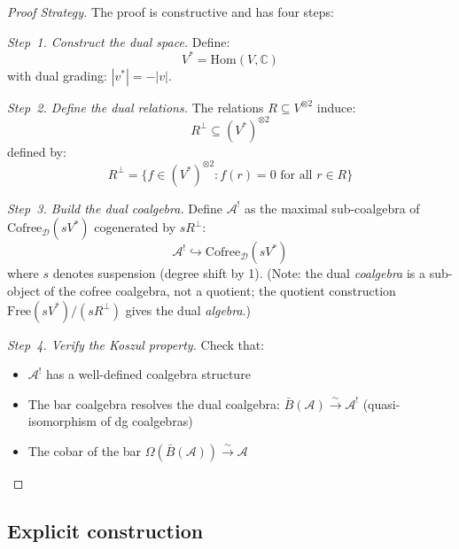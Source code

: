 \begin{proof}[Proof Strategy]
The proof is constructive and has four steps:

\emph{Step~1. Construct the dual space.}
Define:
\[V^* = \text{Hom}(V, \mathbb{C})\]
with dual grading: $|v^*| = -|v|$.

\emph{Step~2. Define the dual relations.}
The relations $R \subseteq V^{\otimes 2}$ induce:
\[R^\perp \subseteq (V^*)^{\otimes 2}\]
defined by:
\[R^\perp = \{f \in (V^*)^{\otimes 2} : f(r) = 0 \text{ for all } r \in R\}\]

\emph{Step~3. Build the dual coalgebra.}
Define $\mathcal{A}^!$ as the maximal sub-coalgebra of $\text{Cofree}_{\mathcal{D}}(sV^*)$ cogenerated by $sR^\perp$:
\[\mathcal{A}^! \hookrightarrow \text{Cofree}_{\mathcal{D}}(sV^*)\]
where $s$ denotes suspension (degree shift by 1).  (Note: the dual \emph{coalgebra} is a sub-object of the cofree coalgebra, not a quotient; the quotient construction $\text{Free}(sV^*)/(sR^\perp)$ gives the dual \emph{algebra}.)

\emph{Step~4. Verify the Koszul property.}
Check that:
\begin{itemize}
\item $\mathcal{A}^!$ has a well-defined coalgebra structure
\item The bar coalgebra resolves the dual coalgebra: $\bar{B}(\mathcal{A}) \xrightarrow{\sim} \mathcal{A}^!$ (quasi-isomorphism of dg coalgebras)
\item The cobar of the bar $\Omega(\bar{B}(\mathcal{A})) \xrightarrow{\sim} \mathcal{A}$
\end{itemize}
\end{proof}

\subsection{Explicit construction}


